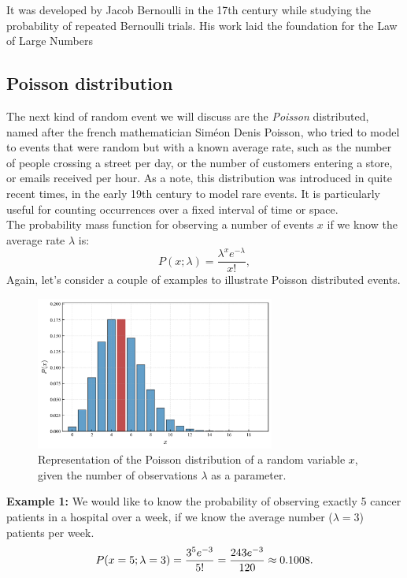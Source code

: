 \documentclass{book}
\begin{document}
It was developed by Jacob Bernoulli in the 17th century while studying the probability of repeated Bernoulli trials. His work laid the foundation for the Law of Large Numbers

\subsection{Poisson distribution}

The next kind of random event we will discuss are the \textit{Poisson} distributed, named after the french mathematician Sim\'eon Denis Poisson, who tried to model to events that were random but with a known average rate, such as the number of people crossing a street per day, or the number of customers entering a store, or emails received per hour.
As a note, this distribution was introduced in quite recent times, in the early 19th century to model rare events. It is particularly useful for counting occurrences over a fixed interval of time or space.\\

The probability mass function for observing a number of events $x$ if we know the average rate $\lambda$ is:
\begin{equation}
    P(x; \lambda) = \frac{\lambda^x e^{-\lambda}}{x!},
\end{equation}
Again, let's consider a couple of examples to illustrate Poisson distributed events.

\begin{figure}[ht]
    \centering
    \includegraphics[width=0.7\textwidth]{figures/chapter2/poisson_1.png}
    \caption{Representation of the Poisson distribution of a random variable $x$, given the number of observations $\lambda$ as a parameter.}
    \label{fig:poisson1}
\end{figure}

\textbf{Example 1:} We would like to know the probability of observing exactly 5 cancer patients in a hospital over a week, if we know the average number ($\lambda = 3$) patients per week.
\begin{equation}
    P(x=5; \lambda = 3) = \frac{3^5 e^{-3}}{5!} = \frac{243 e^{-3}}{120} \approx 0.1008. \notag
\end{equation}\\
\end{document}
